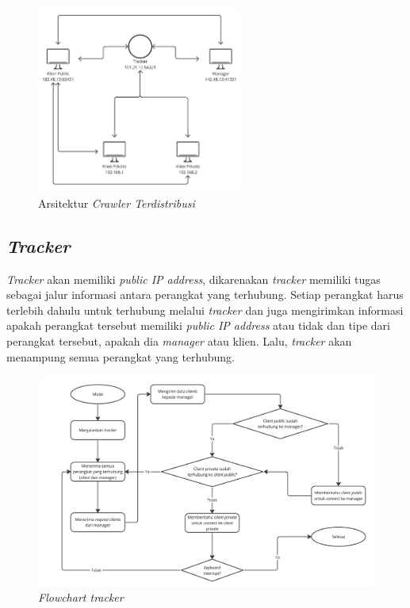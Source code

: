 \begin{figure}[H]
  \centering{}
	\includegraphics[width=0.6\textwidth]{gambar/arsitektur_baru}
  \caption{Arsitektur \emph{Crawler Terdistribusi}}
\end{figure}

\subsection{\emph{Tracker}}
\emph{Tracker} akan memiliki \emph{public IP address}, dikarenakan \emph{tracker} memiliki tugas sebagai jalur informasi antara perangkat yang terhubung. Setiap perangkat harus terlebih dahulu untuk terhubung melalui \emph{tracker} dan juga mengirimkan informasi apakah perangkat tersebut memiliki \emph{public IP address} atau tidak dan tipe dari perangkat tersebut, apakah dia \emph{manager} atau klien. Lalu, \emph{tracker} akan menampung semua perangkat yang terhubung. 
\clearpage

\begin{figure}[H]
	\centering{}
	\includegraphics[width=1\textwidth]{gambar/flowchart_tracker}
	\caption{\emph{Flowchart tracker} }
\end{figure}

